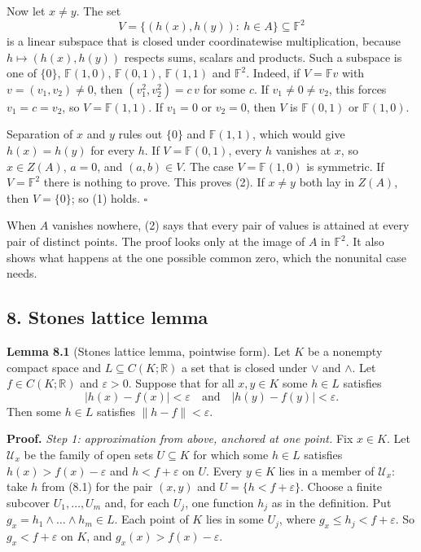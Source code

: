 \documentclass[
  english,
  11pt,
  a4paper,
]{article}
\newcounter{none} %
\begin{document}
Now let \(x\neq y\). The set
\[V=\{(h(x),h(y)):\ h\in A\}\subseteq\mathbb F^2\] is a linear subspace
that is closed under coordinatewise multiplication, because
\(h\mapsto(h(x),h(y))\) respects sums, scalars and products. Such a
subspace is one of \(\{0\}\), \(\mathbb F(1,0)\), \(\mathbb F(0,1)\),
\(\mathbb F(1,1)\) and \(\mathbb F^2\). Indeed, if \(V=\mathbb Fv\) with
\(v=(v_1,v_2)\neq0\), then \((v_1^2,v_2^2)=c\,v\) for some \(c\). If
\(v_1\neq0\neq v_2\), this forces \(v_1=c=v_2\), so
\(V=\mathbb F(1,1)\). If \(v_1=0\) or \(v_2=0\), then \(V\) is
\(\mathbb F(0,1)\) or \(\mathbb F(1,0)\).

Separation of \(x\) and \(y\) rules out \(\{0\}\) and
\(\mathbb F(1,1)\), which would give \(h(x)=h(y)\) for every \(h\). If
\(V=\mathbb F(0,1)\), every \(h\) vanishes at \(x\), so \(x\in Z(A)\),
\(a=0\), and \((a,b)\in V\). The case \(V=\mathbb F(1,0)\) is symmetric.
If \(V=\mathbb F^2\) there is nothing to prove. This proves (2). If
\(x\neq y\) both lay in \(Z(A)\), then \(V=\{0\}\); so (1) holds.
\(\square\)

When \(A\) vanishes nowhere, (2) says that every pair of values is
attained at every pair of distinct points. The proof looks only at the
image of \(A\) in \(\mathbb F^2\). It also shows what happens at the one
possible common zero, which the nonunital case needs.

\subsection[8. Stone\textquotesingle s lattice
lemma]{\texorpdfstring{\protect\hypertarget{the-stone-weierstrass-theorem-for-functions-vanishing-at-infinity--oa-fnd-sw-06}{}{}8.
Stone\textquotesingle s lattice
lemma}{8. Stone\textquotesingle s lattice lemma}}\label{the-stone-weierstrass-theorem-for-functions-vanishing-at-infinity--OA-FND-SW-06}

\textbf{Lemma 8.1} (Stone\textquotesingle s lattice lemma, pointwise
form). Let \(K\) be a nonempty compact space and
\(L\subseteq C(K;\mathbb R)\) a set that is closed under \(\vee\) and
\(\wedge\). Let \(f\in C(K;\mathbb R)\) and \(\varepsilon>0\). Suppose
that for all \(x,y\in K\) some \(h\in L\) satisfies
\[|h(x)-f(x)|<\varepsilon\quad\text{and}\quad|h(y)-f(y)|<\varepsilon .
\tag{8.1}\] Then some \(h\in L\) satisfies \(\|h-f\|<\varepsilon\).

\textbf{Proof.} \emph{Step 1: approximation from above, anchored at one
point.} Fix \(x\in K\). Let \(\mathcal U_x\) be the family of open sets
\(U\subseteq K\) for which some \(h\in L\) satisfies
\(h(x)>f(x)-\varepsilon\) and \(h<f+\varepsilon\) on \(U\). Every
\(y\in K\) lies in a member of \(\mathcal U_x\): take \(h\) from (8.1)
for the pair \((x,y)\) and \(U=\{h<f+\varepsilon\}\). Choose a finite
subcover \(U_1,\dots,U_m\) and, for each \(U_j\), one function \(h_j\)
as in the definition. Put \(g_x=h_1\wedge\dots\wedge h_m\in L\). Each
point of \(K\) lies in some \(U_j\), where
\(g_x\leq h_j<f+\varepsilon\). So \(g_x<f+\varepsilon\) on \(K\), and
\(g_x(x)>f(x)-\varepsilon\).
\end{document}
